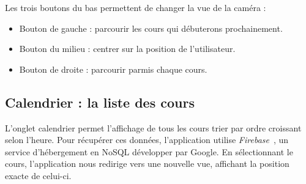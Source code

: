 \documentclass{article}
\begin{document}
Les trois boutons du bas permettent de changer la vue de la caméra :\\

\begin{itemize}
    \item Bouton de gauche : parcourir les cours qui débuterons prochainement.

    \item Bouton du milieu : centrer sur la position de l'utilisateur.

    \item Bouton de droite : parcourir parmis chaque cours.
\end{itemize}



\newpage %



\subsection{Calendrier : la liste des cours}

L'onglet calendrier permet l'affichage de tous les cours trier par ordre croissant selon l'heure. Pour récupérer ces
données, l'application utilise \textit{Firebase}~\cite{firebaseDoc}, un service d'hébergement en NoSQL
développer par Google. En sélectionnant le cours, l'application nous redirige vers une nouvelle vue,
affichant la position exacte de celui-ci.

\vspace{10pt}   %
\end{document}
